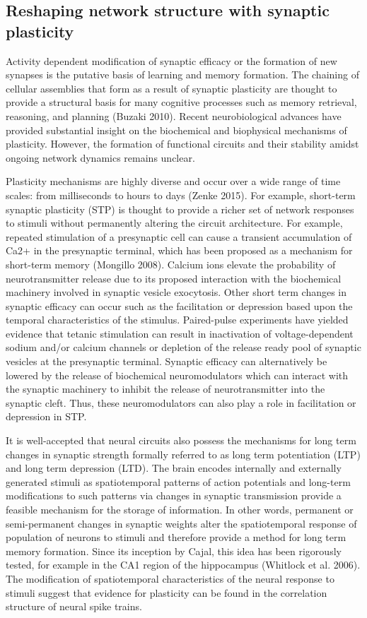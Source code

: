 \documentclass{ucetd}
\begin{document}
\subsection{Reshaping network structure with synaptic plasticity}

Activity dependent modification of synaptic efficacy or the formation of new synapses is the putative basis of learning and memory formation. The chaining of cellular assemblies that form as a result of synaptic plasticity are thought to provide a structural basis for many cognitive processes such as memory retrieval, reasoning, and planning (Buzaki 2010). Recent neurobiological advances have provided substantial insight on the biochemical and biophysical mechanisms of plasticity. However, the formation of functional circuits and their stability amidst ongoing network dynamics remains unclear.

Plasticity mechanisms are highly diverse and occur over a wide range of time scales: from milliseconds to hours to days (Zenke 2015). For example, short-term synaptic plasticity (STP) is thought to provide a richer set of network responses to stimuli without permanently altering the circuit architecture. For example, repeated stimulation of a presynaptic cell can cause a transient accumulation of Ca2+ in the presynaptic terminal, which has been proposed as a mechanism for short-term memory (Mongillo 2008). Calcium ions elevate the probability of neurotransmitter release due to its proposed interaction with the biochemical machinery involved in synaptic vesicle exocytosis. Other short term changes in synaptic efficacy can occur such as the facilitation or depression based upon the temporal characteristics of the stimulus. Paired-pulse experiments have yielded evidence that tetanic stimulation can result in inactivation of voltage-dependent sodium and/or calcium channels or depletion of the release ready pool of synaptic vesicles at the presynaptic terminal. Synaptic efficacy can alternatively be lowered by the release of biochemical neuromodulators which can interact with the synaptic machinery to inhibit the release of neurotransmitter into the synaptic cleft. Thus, these neuromodulators can also play a role in facilitation or depression in STP.

It is well-accepted that neural circuits also possess the mechanisms for long term changes in synaptic strength formally referred to as long term potentiation (LTP) and long term depression (LTD). The brain encodes internally and externally generated stimuli as spatiotemporal patterns of action potentials and long-term modifications to such patterns via changes in synaptic transmission provide a feasible mechanism for the storage of information. In other words, permanent or semi-permanent changes in synaptic weights alter the spatiotemporal response of population of neurons to stimuli and therefore provide a method for long term memory formation. Since its inception by Cajal, this idea has been rigorously tested, for example in the CA1 region of the hippocampus (Whitlock et al. 2006). The modification of spatiotemporal characteristics of the neural response to stimuli suggest that evidence for plasticity can be found in the correlation structure of neural spike trains.
\end{document}
